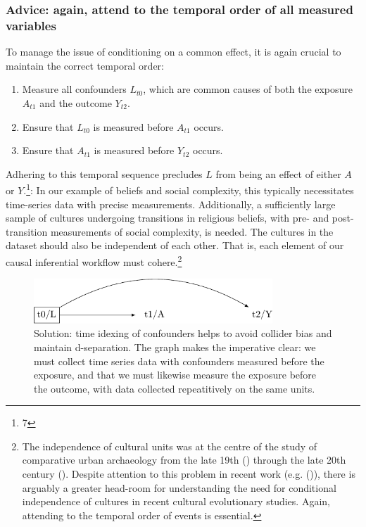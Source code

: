 \documentclass[
  singlecolumn,
  9pt]{article}
\providecommand{\tightlist}{%
  \setlength{\itemsep}{0pt}\setlength{\parskip}{0pt}}\usepackage{longtable,booktabs,array}
\begin{document}
\subsubsection{Advice: again, attend to the temporal order of all
measured
variables}\label{advice-again-attend-to-the-temporal-order-of-all-measured-variables}

To manage the issue of conditioning on a common effect, it is again
crucial to maintain the correct temporal order:

\begin{enumerate}
\def\labelenumi{\arabic{enumi}.}
\tightlist
\item
  Measure all confounders \(L_{t0}\), which are common causes of both
  the exposure \(A_{t1}\) and the outcome \(Y_{t2}\).
\item
  Ensure that \(L_{t0}\) is measured before \(A_{t1}\) occurs.
\item
  Ensure that \(A_{t1}\) is measured before \(Y_{t2}\) occurs.
\end{enumerate}

Adhering to this temporal sequence precludes \(L\) from being an effect
of either \(A\) or \(Y\).\footnote{7}: In our example of beliefs and
social complexity, this typically necessitates time-series data with
precise measurements. Additionally, a sufficiently large sample of
cultures undergoing transitions in religious beliefs, with pre- and
post-transition measurements of social complexity, is needed. The
cultures in the dataset should also be independent of each other. That
is, each element of our causal inferential workflow must
cohere.\footnote{The independence of cultural units was at the centre of
  the study of comparative urban archaeology from the late 19th
  () through the late
  20th century (). Despite
  attention to this problem in recent work (e.g.
  ()), there is
  arguably a greater head-room for understanding the need for
  conditional independence of cultures in recent cultural evolutionary
  studies. Again, attending to the temporal order of events is
  essential.}

\begin{figure}

{\centering \includegraphics[width=0.8\textwidth,height=\textheight]{causal-dags_files/figure-pdf/fig-dag-common-effect-solution-1.pdf}

}

\caption{\label{fig-dag-common-effect-solution}Solution: time idexing of
confounders helps to avoid collider bias and maintain d-separation. The
graph makes the imperative clear: we must collect time series data with
confounders measured before the exposure, and that we must likewise
measure the exposure before the outcome, with data collected
repeatitively on the same units.}

\end{figure}
\end{document}
